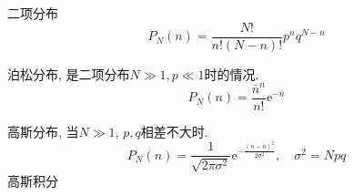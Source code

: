 
二项分布
\begin{equation}
  P_{N}(n) = \frac{N!}{n!(N-n)!} p^n q^{N-n}
\end{equation}

泊松分布, 是二项分布$N\gg 1, p\ll 1$时的情况.
\begin{equation}
  P_N(n) = \frac{\bar{n}^{n}}{n!} \mathrm{e}^{-\bar{n}}
\end{equation}

高斯分布, 当$N\gg 1$, $p,q$相差不大时.
\begin{equation}
  P_N(n) = \frac{1}{\sqrt{2\pi\sigma^{2}}} \mathrm{e}^{- \frac{(n-\bar{n})^2}{2\sigma^2}}, \quad \sigma^2 = Npq
\end{equation}
高斯积分
